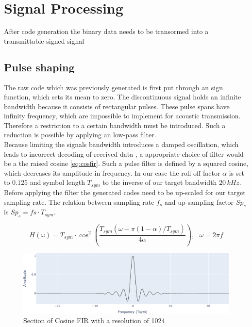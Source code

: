 
\chapter{Signal Processing}
After code generation the binary data needs to be transormed into a transmittable signed signal


\section{Pulse shaping}

The raw code which was previously generated is first put through an sign function, which sets its mean to zero. The discontinuous signal holds an infinite bandwidth because it consists of rectangular pulses. These pulse spans have infinity frequency, which are impossible to implement for acoustic transmission. Therefore a restriction to a certain bandwidth must be introduced. Such a reduction is possible by applying an low-pass filter.\\
Because limiting the signals bandwidth introduces a damped oscillation, which leads to incorrect decoding of received data \cite{bibid}, a appropriate choice of filter would be a the raised cosine \ref{eq:cosfir}. Such a pulse filter is defined by a squared cosine, which decreases its amplitude in frequency. In our case the roll off factor $\alpha$ is set to $0.125$ and symbol length $T_{sym}$ to the inverse of our target bandwidth $20\,kHz$.\\
Before applying the filter the generated codes need to be up-scaled for our target sampling rate. The relation between sampling rate $f_s$ and up-sampling factor $Sp_s$ is $Sp_s=fs\cdot T_{sym}$.

\begin{equation}
	H(\omega)=T_{sym}\cdot \cos^2\left(\dfrac{T_{sym}(\omega-\pi(1-\alpha)/T_{sym})}{4\alpha}\right),~~~\omega=2\pi f
	\label{eq:cosfir}
\end{equation}


\begin{figure}[h]
	\includegraphics[width=\linewidth]{images/cosfir}
	\caption{Section of Cosine FIR with a resolution of 1024}
	\label{fig:cosfir}
\end{figure}


